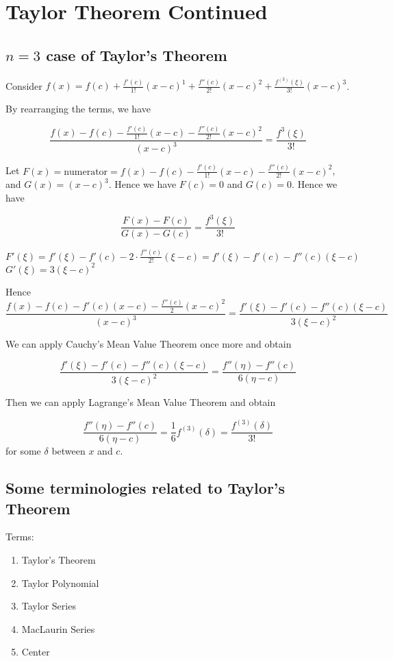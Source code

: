 \section{Taylor Theorem Continued}

\subsection{$n = 3$ case of Taylor's Theorem}

Consider $f(x) = f(c) + \frac{f'(c)}{1!}(x-c)^1 + \frac{f''(c)}{2!}(x-c)^2 + \frac{f^{(3)}(\xi)}{3!}(x-c)^3$.

By rearranging the terms, we have

$$ \frac{f(x) - f(c) - \frac{f'(c)}{1!}(x-c) - \frac{f''(c)}{2!}(x-c)^2}{(x-c)^3} = \frac{f^{3}(\xi)}{3!} $$

Let $F(x) = \text{numerator} = f(x) - f(c) - \frac{f'(c)}{1!}(x - c) - \frac{f''(c)}{2!}(x - c)^2$, and $G(x) = (x - c)^3$. Hence we have $F(c) = 0$ and $G(c) = 0$. Hence we have

$$ \frac{F(x) - F(c)}{G(x) - G(c)}= \frac{f^{3}(\xi)}{3!} $$

$F'(\xi) = f'(\xi) - f'(c) - 2 \cdot \frac{f''(c)}{2!} (\xi - c) = f'(\xi) - f'(c) - f''(c) (\xi - c)$\\
$G'(\xi) = 3 (\xi - c)^2 $

Hence $$ \frac{f(x) - f(c) - f'(c)(x - c) - \frac{f''(c)}{2} (x - c)^2}{(x - c)^3} = \frac{f'(\xi) - f'(c) - f''(c)(\xi - c)}{3(\xi - c)^2} $$

We can apply Cauchy's Mean Value Theorem once more and obtain

$$ \frac{f'(\xi) - f'(c) - f''(c)(\xi - c)}{3(\xi - c)^2} = \frac{f''(\eta) - f''(c)}{6(\eta - c)} $$

Then we can apply Lagrange's Mean Value Theorem and obtain

$$ \frac{f''(\eta) - f''(c)}{6(\eta - c)} = \frac{1}{6}f^{(3)}(\delta) = \frac{f^{(3)}(\delta)}{3!}$$ for some $\delta$ between $x$ and $c$.

\subsection{Some terminologies related to Taylor's Theorem}

Terms:
\begin{enumerate}
  \item Taylor's Theorem
  \item Taylor Polynomial
  \item Taylor Series
  \item MacLaurin Series
  \item Center
\end{enumerate}

